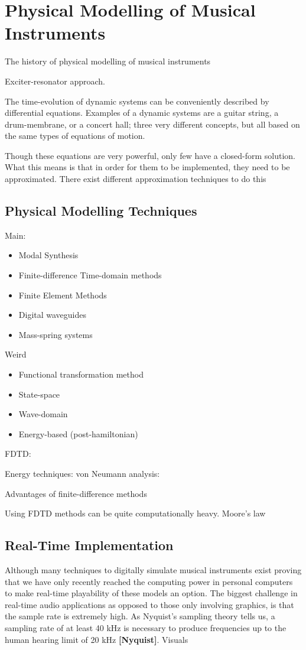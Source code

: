 \chapter{Physical Modelling of Musical Instruments}\label{ch:physMod}

The history of physical modelling of musical instruments

Exciter-resonator approach. 

The time-evolution of dynamic systems can be conveniently described by differential equations. Examples of a dynamic systems are a guitar string, a drum-membrane, or a concert hall; three very different concepts, but all based on the same types of equations of motion.

Though these equations are very powerful, only few have a closed-form solution. What this means is that in order for them to be implemented, they need to be approximated. There exist different approximation techniques to do this  

\section{Physical Modelling Techniques}\label{sec:physModTech}
Main:
\begin{itemize}
    \item Modal Synthesis
    \item Finite-difference Time-domain methods
    \item Finite Element Methods
    \item Digital waveguides
    \item Mass-spring systems 
\end{itemize}
Weird
\begin{itemize}
    \item Functional transformation method
    \item State-space
    \item Wave-domain
    \item Energy-based (post-hamiltonian)
\end{itemize}
    
FDTD: 

Energy techniques: \cite{Gustafsson2013}
von Neumann analysis: \cite{Strikwerda1989}


Advantages of finite-difference methods

Using FDTD methods can be quite computationally heavy. 
Moore's law \cite{Moore1965}

\section{Real-Time Implementation}
Although many techniques to digitally simulate musical instruments exist
proving that we have only recently reached the computing power in personal computers to make real-time playability of these models an option. The biggest challenge in real-time audio applications as opposed to those only involving graphics, is that the sample rate is extremely high. As Nyquist's sampling theory tells us, a sampling rate of at least 40 kHz is necessary to produce frequencies up to the human hearing limit of 20 kHz \textbf{[Nyquist]}. Visuals 


